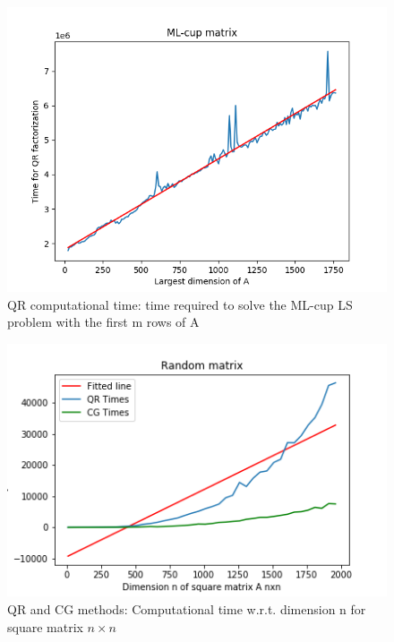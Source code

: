 \documentclass{article}
\begin{document}
         \begin{figure}
            \includegraphics[width=\linewidth]{../results/qr_linear_scaling.png}
            \caption{QR computational time: time required to solve the ML-cup LS problem with the first m rows of A}
             \label{qr_cost}
        \end{figure}
        \begin{figure}
            \includegraphics[width=\linewidth]{../results/square.png}
            \caption{QR and CG methods: Computational time w.r.t. dimension n for square matrix $n \times n$}
            \label{square}
        \end{figure}
\end{document}
